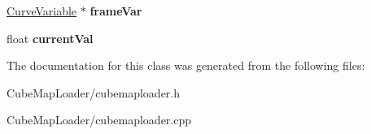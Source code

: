 \begin{DoxyCompactItemize}
\item 
\hypertarget{class_cube_map_loader_a64dd427f626ddaa3e514bd7a5f348fbf}{
\hyperlink{class_curve_variable}{\-Curve\-Variable} $\ast$ {\bfseries frame\-Var}}
\label{class_cube_map_loader_a64dd427f626ddaa3e514bd7a5f348fbf}

\item 
\hypertarget{class_cube_map_loader_a0fe69fe3884e9e74282f5cb1f39f373f}{
float {\bfseries current\-Val}}
\label{class_cube_map_loader_a0fe69fe3884e9e74282f5cb1f39f373f}

\end{DoxyCompactItemize}


\-The documentation for this class was generated from the following files\-:\begin{DoxyCompactItemize}
\item 
\-Cube\-Map\-Loader/cubemaploader.\-h\item 
\-Cube\-Map\-Loader/cubemaploader.\-cpp\end{DoxyCompactItemize}
